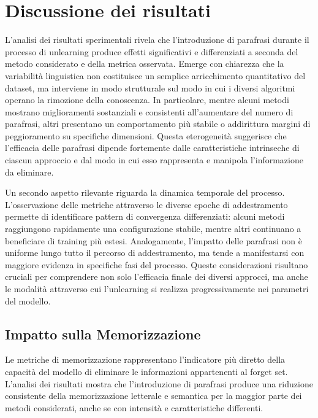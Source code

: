 \section{Discussione dei risultati}

L'analisi dei risultati sperimentali rivela che l'introduzione di parafrasi durante il processo di unlearning produce effetti significativi e differenziati a seconda del metodo considerato e della metrica osservata. Emerge con chiarezza che la variabilità linguistica non costituisce un semplice arricchimento quantitativo del dataset, ma interviene in modo strutturale sul modo in cui i diversi algoritmi operano la rimozione della conoscenza. In particolare, mentre alcuni metodi mostrano miglioramenti sostanziali e consistenti all'aumentare del numero di parafrasi, altri presentano un comportamento più stabile o addirittura margini di peggioramento su specifiche dimensioni. Questa eterogeneità suggerisce che l'efficacia delle parafrasi dipende fortemente dalle caratteristiche intrinseche di ciascun approccio e dal modo in cui esso rappresenta e manipola l'informazione da eliminare.

Un secondo aspetto rilevante riguarda la dinamica temporale del processo. L'osservazione delle metriche attraverso le diverse epoche di addestramento permette di identificare pattern di convergenza differenziati: alcuni metodi raggiungono rapidamente una configurazione stabile, mentre altri continuano a beneficiare di training più estesi. Analogamente, l'impatto delle parafrasi non è uniforme lungo tutto il percorso di addestramento, ma tende a manifestarsi con maggiore evidenza in specifiche fasi del processo. Queste considerazioni risultano cruciali per comprendere non solo l'efficacia finale dei diversi approcci, ma anche le modalità attraverso cui l'unlearning si realizza progressivamente nei parametri del modello.

\subsection{Impatto sulla Memorizzazione}

Le metriche di memorizzazione rappresentano l'indicatore più diretto della capacità del modello di eliminare le informazioni appartenenti al forget set. L'analisi dei risultati mostra che l'introduzione di parafrasi produce una riduzione consistente della memorizzazione letterale e semantica per la maggior parte dei metodi considerati, anche se con intensità e caratteristiche differenti.

